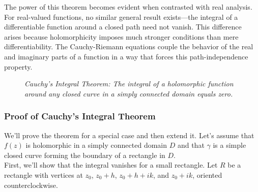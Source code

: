 \noindent The power of this theorem becomes evident when contrasted with real analysis. For real-valued functions, no similar general result exists—the integral of a differentiable function around a closed path need not vanish. This difference arises because holomorphicity imposes much stronger conditions than mere differentiability. The Cauchy-Riemann equations couple the behavior of the real and imaginary parts of a function in a way that forces this path-independence property.


\begin{figure}[H]
\centering
{}
\caption{\textit{Cauchy's Integral Theorem: The integral of a holomorphic function around any closed curve in a simply connected domain equals zero.}}
\label{fig:cauchy-integral-theorem}
\end{figure}

\subsubsection*{Proof of Cauchy's Integral Theorem}

\noindent We'll prove the theorem for a special case and then extend it. Let's assume that $f(z)$ is holomorphic in a simply connected domain $D$ and that $\gamma$ is a simple closed curve forming the boundary of a rectangle in $D$. \\

\noindent First, we'll show that the integral vanishes for a small rectangle. Let $R$ be a rectangle with vertices at $z_0$, $z_0+h$, $z_0+h+ik$, and $z_0+ik$, oriented counterclockwise.

